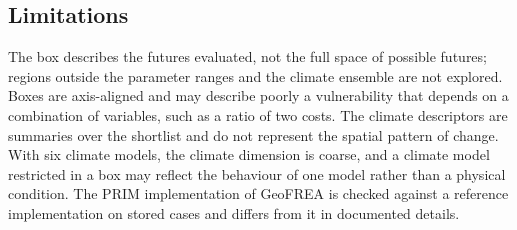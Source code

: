 \subsection{Limitations}
\label{subsec:prim_limitations}

The box describes the futures evaluated, not the full space of possible futures;
regions outside the parameter ranges and the climate ensemble are not explored.
Boxes are axis-aligned and may describe poorly a vulnerability that depends on a
combination of variables, such as a ratio of two costs. The climate descriptors
are summaries over the shortlist and do not represent the spatial pattern of
change. With six climate models, the climate dimension is coarse, and a climate
model restricted in a box may reflect the behaviour of one model rather than a
physical condition. The PRIM implementation of GeoFREA is checked against a
reference implementation on stored cases and differs from it in documented
details.
